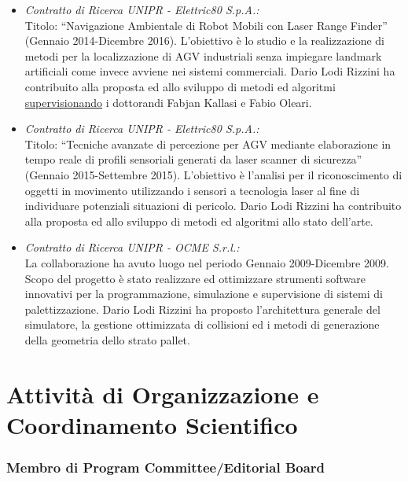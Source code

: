 \documentclass[11pt]{article}
\newcommand{\ITEMDATE}[1]{\item \textit{#1:}\\}
\begin{document}
\begin{itemize}
\ITEMDATE{Contratto di Ricerca UNIPR - Elettric80 S.p.A.} 
Titolo: ``Navigazione Ambientale di Robot Mobili con Laser Range Finder'' (Gennaio 2014-Dicembre 2016). 
L'obiettivo \`e lo studio e la realizzazione di metodi per la localizzazione di AGV industriali 
senza impiegare landmark artificiali come invece avviene nei sistemi commerciali.
Dario Lodi Rizzini ha contribuito alla proposta ed allo sviluppo di metodi ed algoritmi 
\ul{supervisionando} i dottorandi Fabjan Kallasi e Fabio Oleari.

\ITEMDATE{Contratto di Ricerca UNIPR - Elettric80 S.p.A.} 
Titolo: ``Tecniche avanzate di percezione per AGV mediante elaborazione in tempo reale di profili sensoriali generati da laser scanner di sicurezza'' (Gennaio 2015-Settembre 2015). 
L'obiettivo \`e l'analisi per il riconoscimento di oggetti in movimento utilizzando 
i sensori a tecnologia laser al fine di individuare potenziali situazioni di pericolo.
Dario Lodi Rizzini ha contribuito alla proposta ed allo sviluppo di metodi ed algoritmi 
allo stato dell'arte.

\ITEMDATE{Contratto di Ricerca UNIPR - OCME S.r.l.}
La collaborazione ha avuto luogo nel periodo Gennaio 2009-Dicembre 2009. 
Scopo del progetto \`e stato realizzare ed ottimizzare strumenti software innovativi per 
la programmazione, simulazione e supervisione di sistemi di palettizzazione.
Dario Lodi Rizzini ha proposto l'architettura generale del simulatore, la gestione 
ottimizzata di collisioni ed i metodi di generazione della geometria dello strato pallet.

\end{itemize}


\section*{Attivit\`a di Organizzazione e Coordinamento Scientifico}


\subsubsection*{Membro di Program Committee/Editorial Board}
\end{document}
